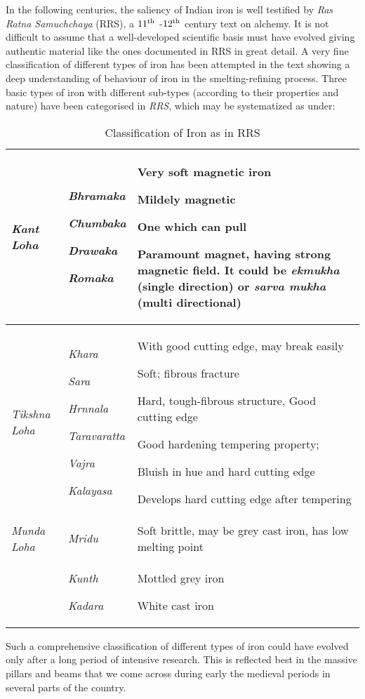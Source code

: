 In the following centuries, the saliency of Indian iron is well testified by {\it Ras Ratna Samuchchaya} (RRS), a $11^{\rm th}$ -$12^{\rm th}$ century text on alchemy. It is not difficult to assume that a well-developed scientific basis must have evolved giving authentic material like the ones documented in RRS in great detail. A very fine classification of different types of iron has been attempted in the text showing a deep understanding of behaviour of iron in the smelting-refining process. Three basic types of iron with different sub-types (according to their properties and nature) have been categorised in {\it RRS}, which may be systematized as under:
\newpage
{\setcounter{table}{0}
\renewcommand{\thetable}{V.\arabic{table}}
{\fontsize{8}{10}\selectfont
\begin{longtable}{|p{.8cm}|p{1.3cm}|p{5.6cm}|}
\caption{Classification of Iron as in RRS}\label{table V.1}\\
\hline
{\it Kant Loha} & {\it Bhramaka}\par  {\it Chumbaka}\par {\it Drawaka}\par {\it Romaka} & Very soft magnetic iron\par Mildely magnetic\par One which can pull\par Paramount magnet, having strong magnetic field. It could be {\it ekmukha} (single direction) or {\it sarva mukha}  (multi directional)\\
\hline
{\it Tikshna Loha} & {\it Khara} \par {\it Sara}\par {\it Hrnnala}\par {\it Taravaratta} \par {\it Vajra }\par {\it Kalayasa} & 
With good cutting edge, may break easily \par Soft; fibrous fracture \par Hard, tough-fibrous structure, Good cutting edge \par Good hardening tempering property; \par Bluish in hue and hard cutting edge \par Develops hard cutting edge after tempering\\
\hline
{\it Munda Loha} & {\it Mridu} & Soft brittle, may be grey cast iron, has low melting point\\
& {\it Kunth} \par {\it Kadara} & Mottled grey iron \par White cast iron\\
\hline
\end{longtable}
}}
Such a comprehensive classification of different types of iron could have evolved only after a long period of intensive research. This is reflected best in the massive pillars and beams that we come across during early the medieval periods in several parts of the country.

